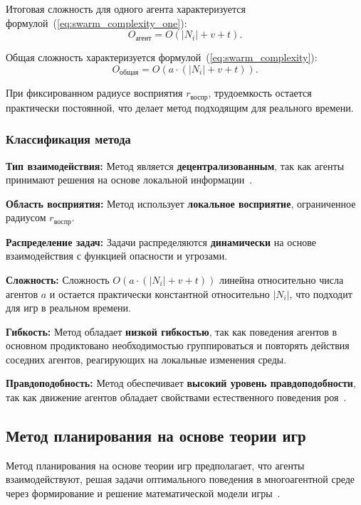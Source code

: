 Итоговая сложность для одного агента характеризуется формулой~(\ref{eq:swarm_complexity_one}):
\begin{equation}
	\label{eq:swarm_complexity_one}
	O_{\text{агент}} = O(|N_i| + v + t).
\end{equation}

Общая сложность характеризуется формулой~(\ref{eq:swarm_complexity}):
\begin{equation}
	\label{eq:swarm_complexity}
	O_{\text{общая}} = O(a \cdot (|N_i| + v + t)).
\end{equation}

При фиксированном радиусе восприятия $r_{\text{воспр}}$, трудоемкость остается практически постоянной, что делает метод подходящим для реального времени.

\subsubsection*{Классификация метода}
\textbf{Тип взаимодействия:}  
Метод является \textbf{децентрализованным}, так как агенты принимают решения на основе локальной информации~\cite{swarm-based-coord}.  

\textbf{Область восприятия:}  
Метод использует \textbf{локальное восприятие}, ограниченное радиусом $r_{\text{воспр}}$.  

\textbf{Распределение задач:}  
Задачи распределяются \textbf{динамически} на основе взаимодействия с функцией опасности и угрозами.  

\textbf{Сложность:}  
Сложность $O(a \cdot (|N_i| + v + t))$ линейна относительно числа агентов $a$ и остается практически константной относительно $|N_i|$, что подходит для игр в реальном времени.  

\textbf{Гибкость:}  
Метод обладает \textbf{низкой гибкостью}, так как поведения агентов в основном продиктовано необходимостью группироваться и повторять действия соседних агентов, реагирующих на локальные изменения среды. 

\textbf{Правдоподобность:}
Метод обеспечивает \textbf{высокий уровень правдоподобности}, так как движение агентов обладает свойствами естественного поведения роя~\cite{swarm-based-coord}.

\subsection{Метод планирования на основе теории игр}

Метод планирования на основе теории игр предполагает, что агенты взаимодействуют, решая задачи оптимального поведения в многоагентной среде через формирование и решение математической модели игры~\cite{gurevich2005multiagent}.


